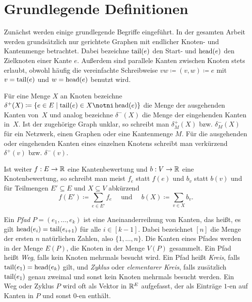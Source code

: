 \section{Grundlegende Definitionen}

Zunächst werden einige grundlegende Begriffe eingeführt.
In der gesamten Arbeit werden grundsätzlich nur gerichtete Graphen mit endlicher Knoten- und Kantenmenge betrachtet.
Dabei bezeichne $\operatorname{tail}(e)$ den Start- und $\operatorname{head}(e)$ den Zielknoten einer Kante $e$.
Außerdem sind parallele Kanten zwischen Knoten stets erlaubt, obwohl häufig die vereinfachte Schreibweise $vw\coloneq (v,w)\coloneq e$ mit $v=\operatorname{tail}(e)$ und $w=\operatorname{head}(e)$ benutzt wird.

Für eine Menge $X$ an Knoten bezeichne $\delta^+(X)\coloneq \{ e\in E \mid \tail(e) \in X \notni \head(e) \}$ die Menge der ausgehenden Kanten von~$X$ und analog bezeichne $\delta^-(X)$ die Menge der eingehenden Kanten in~$X$.
Ist der zugehörige Graph unklar, so schreibt man $\delta^+_M(X)$ bzw. $\delta^-_M(X)$ für ein Netzwerk, einen Graphen oder eine Kantenmenge $M$.
Für die ausgehenden oder eingehenden Kanten eines einzelnen Knotens schreibt man verkürzend $\delta^+(v)$ bzw. $\delta^-(v)$.

Ist weiter $f: E \rightarrow \mathbb{R}$ eine Kantenbewertung und $b: V \rightarrow \mathbb{R}$ eine Knotenbewertung, so schreibt man meist $f_e$ statt $f(e)$ und $b_v$ statt $b(v)$ und für Teilmengen $E'\subseteq E$ und $X\subseteq V$ abkürzend
\[ 
	f(E')\coloneq \sum_{e \in E'} f_e \text{~~~ und ~~~} b(X)\coloneq\sum_{v\in X} b_v.
\]

Ein \emph{Pfad} $P=(e_1, \dots, e_k)$ ist eine Aneinanderreihung von Kanten, das heißt, es gilt $\operatorname{head}(e_i) = \operatorname{tail}(e_{i+1})$ für alle $i\in[k-1]$.
Dabei bezeichnet $[n]$ die Menge der ersten $n$ natürlichen Zahlen, also $\{ 1,\dots, n \}$.
Die Kanten eines Pfades werden in der Menge $E(P)$, die Knoten in der Menge $V(P)$ gesammelt.
Ein Pfad heißt \emph{Weg}, falls kein Knoten mehrmals besucht wird. 
Ein Pfad heißt \emph{Kreis}, falls $\operatorname{tail}(e_1) = \operatorname{head}(e_k)$ gilt, und \emph{Zyklus} oder \emph{elementarer Kreis}, falls zusätzlich $\operatorname{tail}(e_1)$ genau zweimal und sonst kein Knoten mehrmals besucht werden.
Ein Weg oder Zyklus $P$ wird oft als Vektor in $\mathbb{R}^E$ aufgefasst, der als Einträge $1$-en auf Kanten in $P$ und sonst $0$-en enthält.

